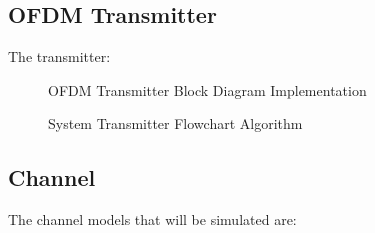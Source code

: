 \subsection{OFDM Transmitter}
The transmitter:
\begin{figure}[htpb!]
	\centerline{\resizebox{15cm}{!}{}}
	\caption{OFDM Transmitter Block Diagram Implementation}
	\label{fig:ofdm_t_meth}
\end{figure}
\begin{figure}[htpb!]
	\centerline{}
	\caption{System Transmitter Flowchart Algorithm}
	\label{fig:system_transmitter}
\end{figure}

\pagebreak


\subsection{Channel}
The channel models that will be simulated are:
